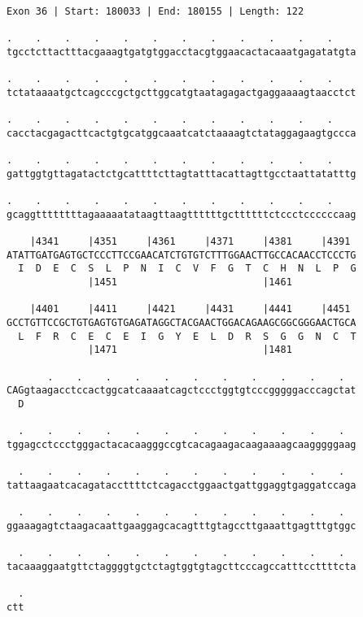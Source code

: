 \documentclass{article}
\begin{document}
\begin{Verbatim}[fontfamily=courier]
Exon 36 | Start: 180033 | End: 180155 | Length: 122

.    .    .    .    .    .    .    .    .    .    .    .    
tgcctcttactttacgaaagtgatgtggacctacgtggaacactacaaatgagatatgta

.    .    .    .    .    .    .    .    .    .    .    .    
tctataaaatgctcagcccgctgcttggcatgtaatagagactgaggaaaagtaacctct

.    .    .    .    .    .    .    .    .    .    .    .    
cacctacgagacttcactgtgcatggcaaatcatctaaaagtctataggagaagtgccca

.    .    .    .    .    .    .    .    .    .    .    .    
gattggtgttagatactctgcattttcttagtatttacattagttgcctaattatatttg

.    .    .    .    .    .    .    .    .    .    .    .    
gcaggttttttttagaaaaatataagttaagttttttgcttttttctccctccccccaag

    |4341     |4351     |4361     |4371     |4381     |4391 
ATATTGATGAGTGCTCCCTTCCGAACATCTGTGTCTTTGGAACTTGCCACAACCTCCCTG
  I  D  E  C  S  L  P  N  I  C  V  F  G  T  C  H  N  L  P  G
              |1451                         |1461           

    |4401     |4411     |4421     |4431     |4441     |4451 
GCCTGTTCCGCTGTGAGTGTGAGATAGGCTACGAACTGGACAGAAGCGGCGGGAACTGCA
  L  F  R  C  E  C  E  I  G  Y  E  L  D  R  S  G  G  N  C  T
              |1471                         |1481           

       .    .    .    .    .    .    .    .    .    .    .  
CAGgtaagacctccactggcatcaaaatcagctccctggtgtcccgggggacccagctat
  D                                                         

  .    .    .    .    .    .    .    .    .    .    .    .  
tggagcctccctgggactacacaagggccgtcacagaagacaagaaaagcaagggggaag

  .    .    .    .    .    .    .    .    .    .    .    .  
tattaagaatcacagataccttttctcagacctggaactgattggaggtgaggatccaga

  .    .    .    .    .    .    .    .    .    .    .    .  
ggaaagagtctaagacaattgaaggagcacagtttgtagccttgaaattgagtttgtggc

  .    .    .    .    .    .    .    .    .    .    .    .  
tacaaaggaatgttctaggggtgctctagtggtgtagcttcccagccatttccttttcta

  .
ctt
\end{Verbatim}
\newpage
\end{document}
